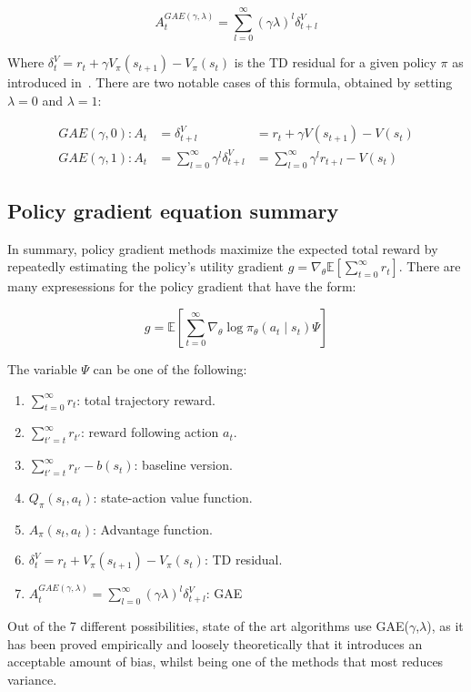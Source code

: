 \documentclass{../main.tex}{}
\begin{document}
\begin{equation}
    A_t^{GAE(\gamma, \lambda)} = \sum_{l=0}^{\infty} (\gamma \lambda)^l \delta_{t+l}^V
\end{equation}

Where $\delta_{t}^V = r_t + \gamma V_{\pi}(s_{t+1}) - V_{\pi}(s_t)$ is the TD residual for a given policy $\pi$ as introduced in~\cite{Sutton1998}. There are two notable cases of this formula, obtained by setting $\lambda = 0$ and $\lambda = 1$:

\begin{equation}
    \begin{aligned}
        GAE(\gamma, 0):  A_t &= \delta_{t+l}^V &= r_t + \gamma V(s_{t+1}) - V(s_t)\\
        GAE(\gamma, 1):  A_t &= \sum_{l=0}^{\infty} \gamma^l \delta_{t+l}^V &= \sum_{l=0}^{\infty} \gamma^l r_{t+l} - V(s_t)
    \end{aligned}
\end{equation}

\subsection{Policy gradient equation summary}

In summary, policy gradient methods maximize the expected total reward by repeatedly estimating the policy's utility gradient $g = \nabla_{\theta} \mathbb{E}[\sum_{t=0}^{\infty}r_t]$. There are many expresessions for the policy gradient that have the form:

\begin{equation}
    g = \mathbb{E}[\sum_{t=0}^{\infty} \nabla_{\theta} \log \pi_{\theta}(a_t \mid s_t) \Psi]
\end{equation}

The variable $\Psi$ can be one of the following:

\begin{multicols}{2}
\begin{enumerate}
    \item $\sum_{t=0}^{\infty} r_t$: total trajectory reward.
    \item $\sum_{t'=t}^{\infty} r_{t'}$: reward following action $a_t$.
    \item $\sum_{t'=t}^{\infty} r_{t'} - b(s_t)$: baseline version. 
    \item $Q_{\pi}(s_t, a_t)$: state-action value function.
    \item $A_{\pi}(s_t, a_t)$: Advantage function.
    \item $\delta_t^V = r_t + V_{\pi}(s_{t+1}) - V_{\pi}(s_t)$: TD residual.
    \item $A_t^{GAE(\gamma, \lambda)} = \sum_{l=0}^{\infty} (\gamma \lambda)^l \delta_{t+l}^V$: GAE
\end{enumerate}
\end{multicols}

Out of the 7 different possibilities, state of the art algorithms use GAE($\gamma$,$\lambda$), as it has been proved empirically and loosely theoretically that it introduces an acceptable amount of bias, whilst being one of the methods that most reduces variance.
\end{document}
